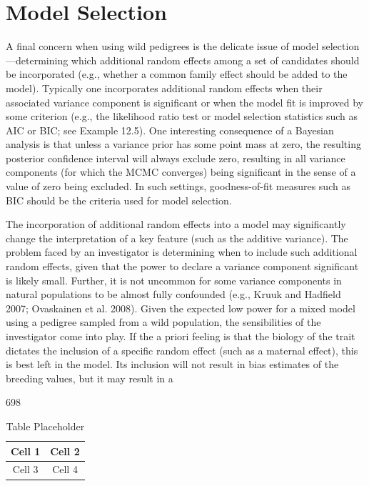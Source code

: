 \documentclass{article}
\begin{document}
\section{Model Selection}
A final concern when using wild pedigrees is the delicate issue of model selection—determining which additional random effects among a set of candidates should be incorporated (e.g., whether a common family effect should be added to the model). Typically one incorporates additional random effects when their associated variance component is significant or when the model fit is improved by some criterion (e.g., the likelihood ratio test or model selection statistics such as AIC or BIC; see Example 12.5). One interesting consequence of a Bayesian analysis is that unless a variance prior has some point mass at zero, the resulting posterior confidence interval will always exclude zero, resulting in all variance components (for which the MCMC converges) being significant in the sense of a value of zero being excluded. In such settings, goodness-of-fit measures such as BIC should be the criteria used for model selection.

The incorporation of additional random effects into a model may significantly change the interpretation of a key feature (such as the additive variance). The problem faced by an investigator is determining when to include such additional random effects, given that the power to declare a variance component significant is likely small. Further, it is not uncommon for some variance components in natural populations to be almost fully confounded (e.g., Kruuk and Hadfield 2007; Ovaskainen et al. 2008). Given the expected low power for a mixed model using a pedigree sampled from a wild population, the sensibilities of the investigator come into play. If the a priori feeling is that the biology of the trait dictates the inclusion of a specific random effect (such as a maternal effect), this is best left in the model. Its inclusion will not result in bias estimates of the breeding values, but it may result in a

698

\begin{table}[h]
\centering
\begin{tabular}{|c|c|}
\hline
Cell 1 & Cell 2 \\
\hline
Cell 3 & Cell 4 \\
\hline
\end{tabular}
\caption{Table Placeholder}
\end{table}
\end{document}
